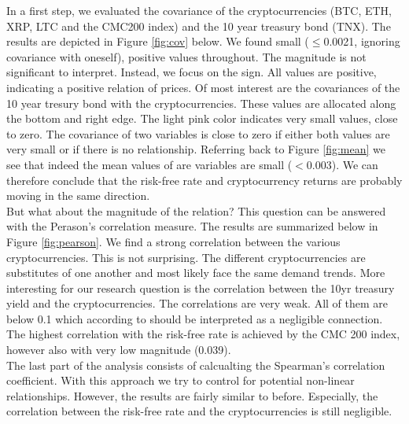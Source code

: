 In a first step, we evaluated the covariance of the cryptocurrencies (BTC, ETH, XRP, LTC and the CMC200 index) and the 10 year treasury bond (TNX). The results are depicted in Figure \ref{fig:cov} below. We found small ($\leq$0.0021, ignoring covariance with oneself), positive values throughout. The magnitude  is not significant to interpret. Instead, we focus on the sign. All values are positive, indicating a positive relation of prices. Of most interest are the covariances of the 10 year tresury bond with the cryptocurrencies. These values are allocated along the bottom and right edge. The light pink color indicates very small values, close to zero. The covariance of two variables is close to zero if either both values are very small or if there is no relationship. Referring back to Figure \ref{fig:mean} we see that indeed the mean values of are variables are small ($<$0.003). We can therefore conclude that the risk-free rate and cryptocurrency returns are probably moving in the same direction.
\\


But what about the magnitude of the relation? This question can be answered with the Perason's correlation measure. The results are summarized below in Figure \ref{fig:pearson}. We find a strong correlation between the various cryptocurrencies. This is not surprising. The different cryptocurrencies are substitutes of one another and most likely face the same demand trends. More interesting for our research question is the correlation between the 10yr treasury yield and the cryptocurrencies. The correlations are very weak. All of them are below 0.1 which according to \citet{corr} should be interpreted as a negligible connection. The highest correlation with the risk-free rate is achieved by the CMC 200 index, however also with very low magnitude (0.039). \\

The last part of the analysis consists of calcualting the Spearman's correlation coefficient. With this approach we try to control for potential non-linear relationships. However, the results are fairly similar to before. Especially, the correlation between the risk-free rate and the cryptocurrencies is still negligible.\\


